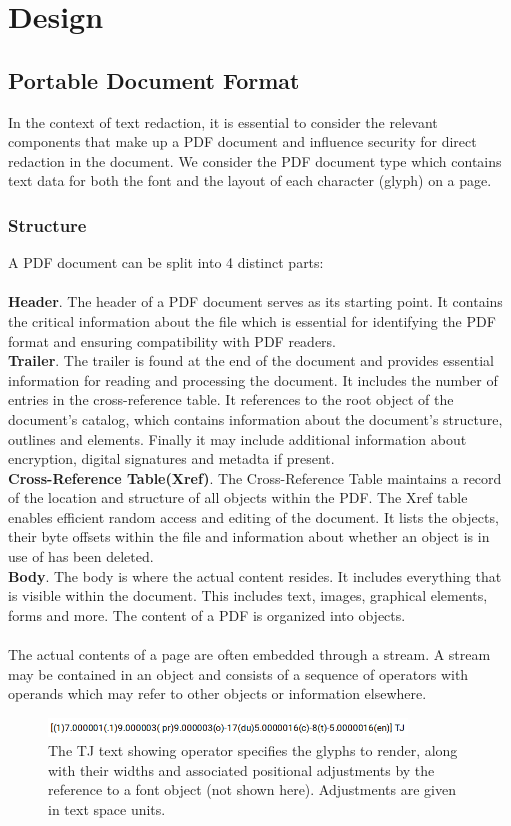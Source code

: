 \chapter{Design}

\section{Portable Document Format}
In the context of text redaction, it is essential to consider the relevant components that make up a PDF document and influence security for direct redaction in the document. We consider the PDF document type which contains text data for both the font and the layout of each character (glyph) on a page. 

\subsection{Structure}
A PDF document can be split into 4 distinct parts: 
\\\\
\textbf{Header}. The header of a PDF document serves as its starting point. It contains the critical information about the file which is essential for identifying the PDF format and ensuring compatibility with PDF readers. \\
\textbf{Trailer}. The trailer is found at the end of the document and provides essential information for reading and processing the document. It includes the number of entries in the cross-reference table. It references to the root object of the document's catalog, which contains information about the document's structure, outlines and elements. Finally it may include additional information about encryption, digital signatures and metadta if present. \\
\textbf{Cross-Reference Table(Xref)}. The Cross-Reference Table maintains a record of the location and structure of all objects within the PDF. The Xref table enables efficient random access and editing of the document. It lists the objects, their byte offsets within the file and information about whether an object is in use of has been deleted. \\
\textbf{Body}. The body is where the actual content resides. It includes everything that is visible within the document. This includes text, images, graphical elements, forms and more. The content of a PDF is organized into objects. 
\\\\
The actual contents of a page are often embedded through a stream. A stream may be contained in an object and consists of a sequence of operators with operands which may refer to other objects or information elsewhere.
\begin{figure}[h]
\includegraphics[width=0.85\textwidth]{latex/media/TJexample.png}
\centering
\caption{The TJ text showing operator specifies the glyphs to render, along with their widths and associated positional adjustments by the reference to a font object (not shown here). Adjustments are given in text space units. }
\label{fig:tjexample}
\end{figure}
